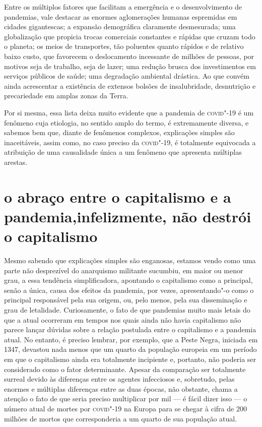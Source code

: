 Entre os múltiplos fatores que facilitam a emergência e o
desenvolvimento de pandemias, vale destacar as enormes aglomerações
humanas espremidas em cidades gigantescas; a expansão demográfica
claramente desmesurada; uma globalização que propicia trocas comerciais
constantes e rápidas que cruzam todo o planeta; os meios de transportes,
tão poluentes quanto rápidos e de relativo baixo custo, que favorecem o
deslocamento incessante de milhões de pessoas, por motivos seja de
trabalho, seja de lazer; uma redução brusca dos investimentos em
serviços públicos de saúde; uma degradação ambiental drástica. Ao que
convém ainda acrescentar a existência de extensos bolsões de
insalubridade, desnutrição e precariedade em amplas zonas da Terra.

Por si mesma, essa lista deixa muito evidente que a pandemia de \textsc{covid}"-19
é um fenômeno cuja etiologia, no sentido amplo do termo, é extremamente
diversa, e sabemos bem que, diante de fenômenos complexos, explicações
simples são inaceitáveis, assim como, no caso preciso da \textsc{covid}"-19, é
totalmente equivocada a atribuição de uma causalidade única a um
fenômeno que apresenta múltiplas arestas.

\section{o abraço entre o capitalismo e a pandemia,\break infelizmente, não destrói o capitalismo}

Mesmo sabendo que explicações simples são enganosas, estamos vendo como
uma parte não desprezível do anarquismo militante sucumbiu, em maior ou
menor grau, a essa tendência simplificadora, apontando o capitalismo
como a principal, senão a única, causa dos efeitos da pandemia, por
vezes, apresentando"-o como o principal responsável pela sua origem, ou,
pelo menos, pela sua disseminação e grau de letalidade. Curiosamente, o
fato de que pandemias muito mais letais do que a atual ocorreram em
tempos nos quais ainda não havia capitalismo não parece lançar dúvidas
sobre a relação postulada entre o capitalismo e a pandemia atual. No
entanto, é preciso lembrar, por exemplo, que a Peste Negra, iniciada em
1347, devastou nada menos que um quarto da população europeia em um
período em que o capitalismo ainda era totalmente incipiente e,
portanto, não poderia ser considerado como o fator determinante. Apesar
da comparação ser totalmente surreal devido às diferenças entre os
agentes infecciosos e, sobretudo, pelas enormes e múltiplas diferenças
entre as duas épocas, não obstante, chama a atenção o fato de que seria
preciso multiplicar por mil --- é fácil dizer isso --- o número atual de
mortes por \textsc{covid}"-19 na Europa para se chegar à cifra de 200 milhões de
mortos que corresponderia a um quarto de sua população atual.

